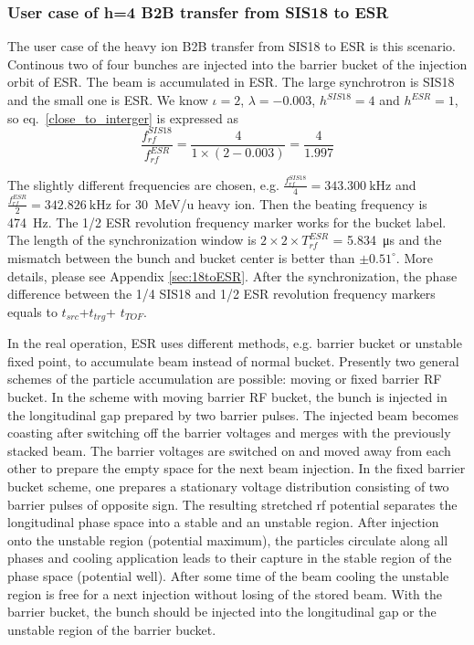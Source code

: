 \subsubsection{User case of h=4 B2B transfer from SIS18 to ESR} 
The user case of the heavy ion B2B transfer from SIS18 to ESR is this scenario. Continous two of four bunches are injected into the barrier bucket of the injection orbit of ESR. The beam is accumulated in ESR. The large synchrotron is SIS18 and the small one is ESR. We know $\iota=2$, $\lambda=-0.003$, $h^{SIS18}=4$ and $h^{ESR}=1$, so eq.~\ref{close_to_interger} is expressed as
\begin{equation}
\frac {f_{rf}^{SIS18}}{f_{rf}^{ESR}}= \frac {4}{1 \times(2- 0.003)}=\frac{4}{1.997}
\end{equation}

The slightly different frequencies are chosen, e.g. $\frac{f_{rf}^{SIS18}}{4}=\SI{343.300}{\kHz}$ and $\frac{f_{rf}^{ESR}}{2}=\SI{342.826}{\kHz}$ for \SI{30}{MeV/\atomicmassunit} heavy ion. Then the beating frequency is \SI{474}{\Hz}. The 1/2 ESR revolution frequency marker works for the bucket label. The length of the synchronization window is $2\times 2\times T_{rf}^{ESR}$ = \SI{5.834}{\us} and the mismatch between the bunch and bucket center is better than $\pm0.51^\circ$. More details, please see Appendix \ref{sec:18toESR}.  After the synchronization, the phase difference between the 1/4 SIS18 and 1/2 ESR revolution frequency markers equals to $t_{src}$+$t_{trg}$+ $t_{TOF}$.

In the real operation, ESR uses different methods, e.g. barrier bucket or unstable fixed point, to accumulate beam instead of normal bucket.  Presently two general schemes of the particle accumulation are possible: moving or fixed barrier RF bucket. In the scheme with moving barrier RF bucket, the bunch is injected in the longitudinal gap prepared by two barrier pulses. The injected beam becomes coasting after switching off the barrier voltages and merges with
the previously stacked beam. The barrier voltages are switched on and moved away from each other to prepare the empty space for the next beam injection. In the fixed barrier bucket scheme, one prepares a stationary voltage distribution consisting of two barrier pulses of opposite sign. The resulting stretched rf potential separates the longitudinal phase space into a stable and an unstable region. After injection onto the unstable region (potential maximum), the particles circulate along all phases and cooling application leads to their capture in the stable region of the phase space (potential well). After some time of the beam cooling the unstable region is free for a next injection without losing of the stored beam. With the barrier bucket, the bunch should be injected into the longitudinal gap or the unstable region of the barrier bucket.

